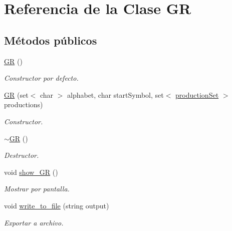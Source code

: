 \hypertarget{class_g_r}{}\section{Referencia de la Clase GR}
\label{class_g_r}
\subsection*{Métodos públicos}
\begin{DoxyCompactItemize}
\item 
\mbox{\label{class_g_r_aff4f34db25390eab80d4115c31bd04ae}} 
\mbox{\hyperlink{class_g_r_aff4f34db25390eab80d4115c31bd04ae}{GR}} ()
\begin{DoxyCompactList}\small\item\em Constructor por defecto. \end{DoxyCompactList}\item 
\mbox{\label{class_g_r_a22be7483dc6bfa8509f1808b6669325f}} 
\mbox{\hyperlink{class_g_r_a22be7483dc6bfa8509f1808b6669325f}{GR}} (set$<$ char $>$ alphabet, char start\+Symbol, set$<$ \mbox{\hyperlink{classproduction_set}{production\+Set}} $>$ productions)
\begin{DoxyCompactList}\small\item\em Constructor. \end{DoxyCompactList}\item 
\mbox{\label{class_g_r_aacb926609594fac47e7a28f5a27970c3}} 
\mbox{\hyperlink{class_g_r_aacb926609594fac47e7a28f5a27970c3}{$\sim$\+GR}} ()
\begin{DoxyCompactList}\small\item\em Destructor. \end{DoxyCompactList}\item 
void \mbox{\hyperlink{class_g_r_a1d67678144e903639687bf2935a1c88e}{show\+\_\+\+GR}} ()
\begin{DoxyCompactList}\small\item\em Mostrar por pantalla. \end{DoxyCompactList}\item 
void \mbox{\hyperlink{class_g_r_a7c2b175ca3286a673ad4281807bf4cc6}{write\+\_\+to\+\_\+file}} (string output)
\begin{DoxyCompactList}\small\item\em Exportar a archivo. \end{DoxyCompactList}\end{DoxyCompactItemize}


